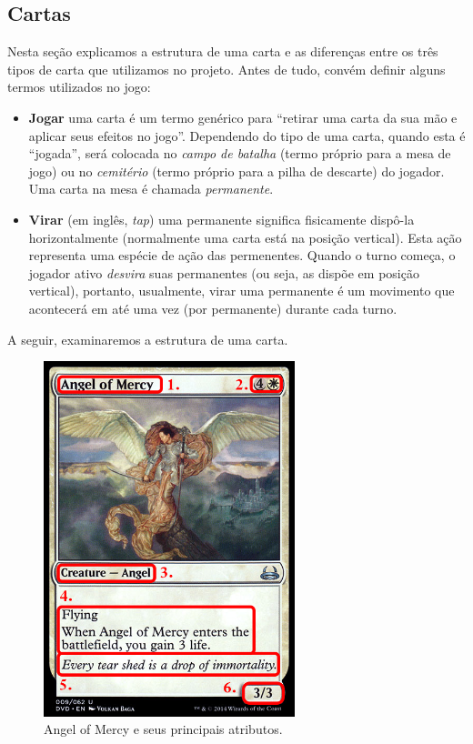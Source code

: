 \subsection{Cartas}

Nesta seção explicamos a estrutura de uma carta e as diferenças entre os três tipos de carta que utilizamos no projeto. Antes de tudo, convém definir alguns termos utilizados no jogo:

\begin{itemize}
  \item \textbf{Jogar} uma carta é um termo genérico para ``retirar uma carta da sua mão e aplicar seus efeitos no jogo''. Dependendo do tipo de uma carta, quando esta é ``jogada'', será colocada no \textit{campo de batalha} (termo próprio para a mesa de jogo) ou no \textit{cemitério} (termo próprio para a pilha de descarte) do jogador. Uma carta na mesa é chamada \textit{permanente}.
  \item \textbf{Virar} (em inglês, \textit{tap}) uma permanente significa fisicamente dispô-la horizontalmente (normalmente uma carta está na posição vertical). Esta ação representa uma espécie de ação das permenentes. Quando o turno começa, o jogador ativo \textit{desvira} suas permanentes (ou seja, as dispõe em posição vertical), portanto, usualmente, virar uma permanente é um movimento que acontecerá em até uma vez (por permanente) durante cada turno.
\end{itemize}

A seguir, examinaremos a estrutura de uma carta.

\begin{figure}[!ht]
    \centering
    \includegraphics[width=0.65\textwidth]{picstcc/angelnumbers.png}
    \caption{Angel of Mercy e seus principais atributos.}
    \label{cardinfo}
\end{figure}

